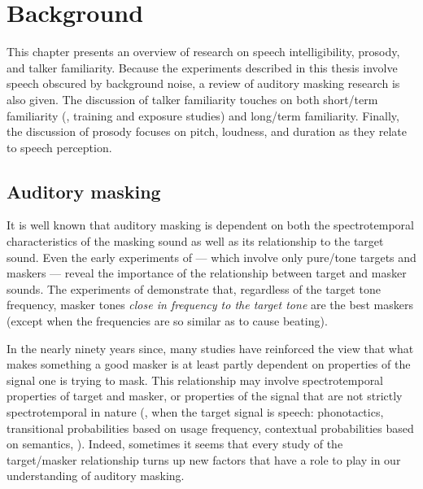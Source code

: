 \chapter{Background\label{chap:Background}}
This chapter presents an overview of research on speech intelligibility, prosody, and talker familiarity.  Because the experiments described in this thesis involve speech obscured by background noise, a review of auditory masking research is also given.  The discussion of talker familiarity touches on both short\-/term familiarity (\ie, training and exposure studies) and long\-/term familiarity.  Finally, the discussion of prosody focuses on pitch, loudness, and duration as they relate to speech perception.

\section{Auditory masking}
It is well known that auditory masking is dependent on both the spectrotemporal characteristics of the masking sound as well as its relationship to the target sound.  %
Even the early experiments of \citet{WegelLane1924} — which involve only pure\-/tone targets and maskers — reveal the importance of the relationship between target and masker sounds.  The experiments of \citeauthor*{WegelLane1924} demonstrate that, regardless of the target tone frequency, masker tones \emph{close in frequency to the target tone} are the best maskers (except when the frequencies are so similar as to cause beating).  

In the nearly ninety years since, many studies have reinforced the view that what makes something a good masker is at least partly dependent on properties of the signal one is trying to mask.  This relationship may involve spectrotemporal properties of target and masker, or properties of the signal that are not strictly spectrotemporal in nature (\eg, when the target signal is speech: phonotactics, transitional probabilities based on usage frequency, contextual probabilities based on semantics, \etc).  Indeed, sometimes it seems that every study of the target\-/masker relationship turns up new factors that have a role to play in our understanding of auditory masking.

